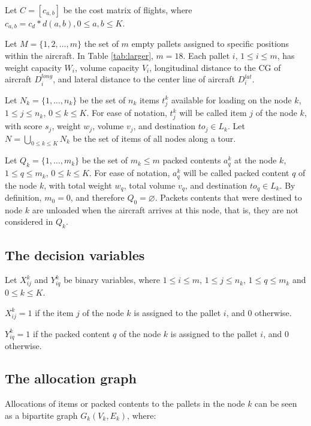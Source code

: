 \documentclass[preprint]{elsarticle}
\begin{document}
Let $C=\left[c_{a,b}\right]$\/ be the cost matrix of flights, where $c_{a,b} = c_d*d(a,b), 0 \leq a,b \leq K$.

Let $M = \{1, 2, \ldots, m \}$\/ the set of $m$\/ empty pallets assigned to specific positions within the aircraft. In Table \ref{tab:larger}, $m=18$. Each pallet $i$, $1 \leq i \leq m$, has weight capacity $W_i$, volume capacity $V_i$, longitudinal distance to the CG of aircraft $D^{long}_i$, and lateral distance to the center line of aircraft $D^{lat}_i$. 

Let $N_k = \{1, \ldots, n_k \}$\/ be the set of $n_k$\/ items $t_j^k$\/ available for loading on the node $k$, $1 \leq j \leq n_k$, $0 \leq k \leq K$. For ease of notation, $t_j^k$\/ will be called item $j$\/ of the node $k$, with score $s_j$, weight $w_j$, volume $v_j$, and destination $to_j \in L_k$. Let $N = \bigcup_{0 \leq k \leq K} N_k$ be the set of items of all nodes along a tour.

Let $Q_k = \{1, \ldots, m_k \}$\/ be the set of $m_k \leq m$\/ packed contents $a^k_q$\/ at the node $k$, $1 \leq q \leq m_k$, $0 \leq k \leq K$. For ease of notation, $a^k_q$\/ will be called packed content $q$\/ of the node $k$, with total weight $w_q$, total volume $v_q$, and destination $to_q \in L_k$. By definition, $m_0 = 0$, and therefore $Q_0 = \varnothing$. Packets contents that were destined to node $k$\/ are unloaded when the aircraft arrives at this node, that is, they are not considered in $Q_k$.


\subsection{The decision variables}

Let $X_{ij}^k$\/ and $Y_{iq}^k$\/ be binary variables, where $1 \leq i \leq m$, $1 \leq j \leq n_k$, $1 \leq q \leq m_k$\/ and $0 \leq k \leq K$.

$X_{ij}^k = 1$\/ if the item $j$\/ of the node $k$\/ is assigned to the pallet $i$, and 0 otherwise.

$Y_{iq}^k = 1$\/ if the packed content $q$\/ of the node $k$\/ is assigned to the pallet $i$, and 0 otherwise.


\subsection{The allocation graph}

Allocations of items or packed contents to the pallets in the node $k$\/ can be seen as a bipartite graph $G_k(V_k, E_k)$, where:
\end{document}
